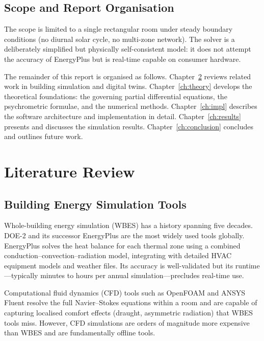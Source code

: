 \documentclass[12pt,a4paper]{report}
\begin{document}
\section{Scope and Report Organisation}
\label{sec:scope}

The scope is limited to a single rectangular room under steady boundary conditions (no diurnal solar cycle, no multi-zone network). The solver is a deliberately simplified but physically self-consistent model: it does not attempt the accuracy of EnergyPlus but is real-time capable on consumer hardware.

The remainder of this report is organised as follows. Chapter~\ref{ch:lit} reviews related work in building simulation and digital twins. Chapter~\ref{ch:theory} develops the theoretical foundations: the governing partial differential equations, the psychrometric formulae, and the numerical methods. Chapter~\ref{ch:impl} describes the software architecture and implementation in detail. Chapter~\ref{ch:results} presents and discusses the simulation results. Chapter~\ref{ch:conclusion} concludes and outlines future work.

\chapter{Literature Review}
\label{ch:lit}

\section{Building Energy Simulation Tools}
\label{sec:bes_tools}

Whole-building energy simulation (WBES) has a history spanning five decades. DOE-2 \cite{winkelmann1993} and its successor EnergyPlus \cite{crawley2001} are the most widely used tools globally. EnergyPlus solves the heat balance for each thermal zone using a combined conduction--convection--radiation model, integrating with detailed HVAC equipment models and weather files. Its accuracy is well-validated but its runtime---typically minutes to hours per annual simulation---precludes real-time use.

Computational fluid dynamics (CFD) tools such as OpenFOAM and ANSYS Fluent resolve the full Navier--Stokes equations within a room and are capable of capturing localised comfort effects (draught, asymmetric radiation) that WBES tools miss. However, CFD simulations are orders of magnitude more expensive than WBES and are fundamentally offline tools.
\end{document}
